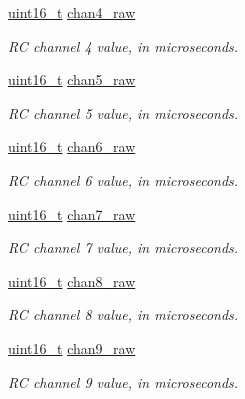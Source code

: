 \begin{DoxyCompactItemize}
\hyperlink{stdint_8h_a273cf69d639a59973b6019625df33e30}{uint16\-\_\-t} \hyperlink{struct____mavlink__hil__rc__inputs__raw__t_a762888a4e5d0273d9042bd1924c8b95b}{chan4\-\_\-raw}
\begin{DoxyCompactList}\small\item\em R\-C channel 4 value, in microseconds. \end{DoxyCompactList}\item 
\hyperlink{stdint_8h_a273cf69d639a59973b6019625df33e30}{uint16\-\_\-t} \hyperlink{struct____mavlink__hil__rc__inputs__raw__t_aa351a492148d22983343be216e10e945}{chan5\-\_\-raw}
\begin{DoxyCompactList}\small\item\em R\-C channel 5 value, in microseconds. \end{DoxyCompactList}\item 
\hyperlink{stdint_8h_a273cf69d639a59973b6019625df33e30}{uint16\-\_\-t} \hyperlink{struct____mavlink__hil__rc__inputs__raw__t_a861d32c4cee885839426c6c27e9985f7}{chan6\-\_\-raw}
\begin{DoxyCompactList}\small\item\em R\-C channel 6 value, in microseconds. \end{DoxyCompactList}\item 
\hyperlink{stdint_8h_a273cf69d639a59973b6019625df33e30}{uint16\-\_\-t} \hyperlink{struct____mavlink__hil__rc__inputs__raw__t_a58471d376608366dc4e762c1cc07f0da}{chan7\-\_\-raw}
\begin{DoxyCompactList}\small\item\em R\-C channel 7 value, in microseconds. \end{DoxyCompactList}\item 
\hyperlink{stdint_8h_a273cf69d639a59973b6019625df33e30}{uint16\-\_\-t} \hyperlink{struct____mavlink__hil__rc__inputs__raw__t_a5e2a946b0960b971317637874d4f2678}{chan8\-\_\-raw}
\begin{DoxyCompactList}\small\item\em R\-C channel 8 value, in microseconds. \end{DoxyCompactList}\item 
\hyperlink{stdint_8h_a273cf69d639a59973b6019625df33e30}{uint16\-\_\-t} \hyperlink{struct____mavlink__hil__rc__inputs__raw__t_aebe7c293f27d5b25c78caa8f762c57e2}{chan9\-\_\-raw}
\begin{DoxyCompactList}\small\item\em R\-C channel 9 value, in microseconds. \end{DoxyCompactList}\item 

\end{DoxyCompactItemize}
